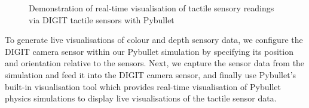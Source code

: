 \documentclass[11pt, a4paper]{report}
\begin{document}
\begin{figure}[H]%
    \centering
    \qquad
    \caption{Demonstration of real-time visualisation of tactile sensory readings via DIGIT tactile sensors with Pybullet}%
    \label{fig:3.5}%
\end{figure}

To generate live visualisations of colour and depth sensory data, we configure the DIGIT camera sensor within our Pybullet simulation by specifying its position and orientation relative to the sensors. Next, we capture the sensor data from the simulation and feed it into the DIGIT camera sensor, and finally use Pybullet's built-in visualisation tool which provides real-time visualisation of Pybullet physics simulations to display live visualisations of the tactile sensor data.
\end{document}
